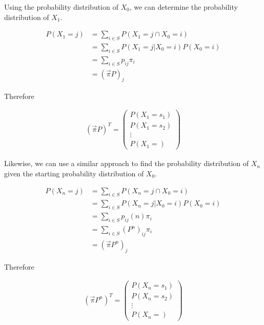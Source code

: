 \documentclass[a4paper,12pt]{article}
\theoremstyle{definition}
\begin{document}
Using the probability distribution of $X_0$, we can determine the probability distribution of $X_1$.

	\begin{equation*}
	\begin{aligned}
		P(X_1 = j) &= \sum_{i \in S} P(X_1 = j \cap X_0 = i) \\
					&= \sum_{i \in S} P(X_1 = j | X_0 = i)P(X_0 = i) \\
					&= \sum_{i \in S} p_{ij}\pi_i \\
					&= (\vec{\pi}P)_j
	\end{aligned}
	\end{equation*}	
			     	 
	Therefore
	
	\begin{equation*}
	\begin{aligned}
		 (\vec{\pi}P)^T =
		 \begin{pmatrix}
		 P(X_1 = s_1) \\
		 P(X_1 = s_2) \\ 
		 \vdots \\
		 P(X_1 =)
		 \end{pmatrix}
	\end{aligned}
	\end{equation*}
	
Likewise, we can use a similar approach to find the probability distribution of $X_n$ given the starting probability distribution of $X_0$. 

	\begin{equation*}
	\begin{aligned}
		P(X_n = j) &= \sum_{i \in S} P(X_n = j \cap X_0 = i) \\
				 	 &= \sum_{i \in S} P(X_n = j | X_0 = i)P(X_0 = i) \\
			     	 &= \sum_{i \in S} p_{ij}(n)\pi_i \\
			     	 &= \sum_{i \in S} (P^n)_{ij}\pi_i \\
			     	 &= (\vec{\pi}P^n)_j
	\end{aligned}
	\end{equation*}	
	
	Therefore
	
	\begin{equation*}
	\begin{aligned}
		 (\vec{\pi}P^n)^T =
		 \begin{pmatrix}
		 P(X_n = s_1) \\
		 P(X_n = s_2) \\ 
		 \vdots \\
		 P(X_n =)
		 \end{pmatrix}
	\end{aligned}
	\end{equation*}
	
\end{document}
